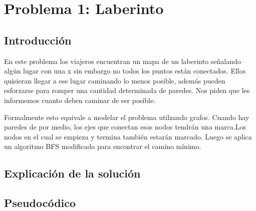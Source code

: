 \documentclass[spanish,12pt]{article}
\begin{document}
\author{Grupo  \\Alvarez Vico Jazm\'in\\Cortés Conde Titó Javier María\\Pedraza Marcelo \\ Rozenberg Uriel Jonathan}


\maketitle


\clearpage

\tableofcontents
\cleardoublepage

\section{Problema 1: Laberinto}

\subsection{Introducción}

En este problema los viajeros encuentran un mapa de un laberinto señalando algún lugar con una x sin embargo no todos los puntos están conectados. Ellos quisieran llegar a ese lugar caminando lo menos posible, además pueden esforzarse para romper una cantidad determinada de paredes. Nos piden que les informemos cuanto deben caminar de ser posible.

Formalmente esto equivale a modelar el problema utilzando grafos. Cuando hay paredes de por medio, los ejes que conectan esos nodos tendrán una marca.Los nodos en el cual se empieza y termina también estarán marcado. Luego se aplica un algoritmo BFS modificado para encontrar el camino mínimo. 

\subsection{Explicación de la solución}





\subsection{Pseudocódico}
\end{document}
